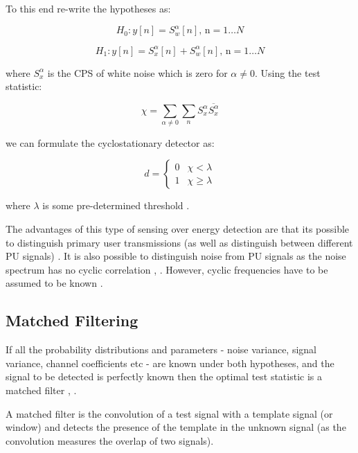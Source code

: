 To this end re-write the hypotheses as:

\begin{equation}
H_{0}: y\left[n\right] = S_{w}^\alpha \left[n\right] \text{,  n} =  1 \ldots N 
\end{equation}
\label{c1}

\begin{equation}
H_{1}: y\left[n \right] = S_{x}^{\alpha} \left[n\right] + S_{w}^{\alpha} \left[n\right] \text{,  n} =  1 \ldots N 
\end{equation}
\label{c2}

where \(S_{x}^{\alpha}\) is the CPS of white noise which is zero for \(\alpha \neq 0 \).  Using the test statistic:

\begin{equation}
\chi = \sum_{\alpha \neq 0} \sum_{n} S_{x}^{\alpha} \overline{S_{x}^{\alpha}}
\end{equation}

we can formulate the cyclostationary detector as:

\begin{equation}
 d =
  \begin{cases}
   0 & \chi < \lambda  \\
   1 & \chi \geq \lambda
  \end{cases}
\end{equation}

where \(\lambda\) is some pre-determined threshold \cite{Ghozzi2006}. 

The advantages of this type of sensing over energy detection are that its possible to distinguish primary user transmissions (as well as distinguish between different PU signals) \cite{lunden2007spectrum}. It is also possible to distinguish noise from PU signals as the noise spectrum has no cyclic correlation \cite{cabric2004implementation}, \cite{vcabric2005physical}. However, cyclic frequencies have to be assumed to be known \cite{Ghozzi2006}. 

\subsection{Matched Filtering}
If all the probability distributions and parameters  - noise variance, signal variance, channel coefficients etc - are known under both hypotheses, and the signal to be detected is perfectly known then the optimal test statistic is a matched filter \cite{cabric2004implementation}, \cite{yucek2009survey}.

A matched filter is the convolution of a test signal with a template signal (or window) and detects the presence of the template in the unknown signal (as the convolution measures the overlap of two signals).

